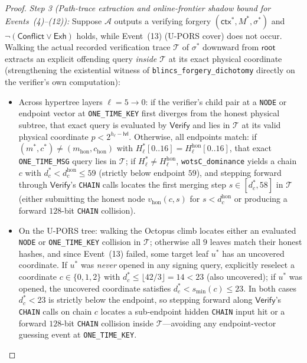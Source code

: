\documentclass[11pt,a4paper]{article}
\theoremstyle{definition}
\theoremstyle{remark}
\newcommand{\UPORS}{\textsf{U-PORS}}
\begin{document}
\begin{proof}
\emph{Step 3 (Path-trace extraction and online-frontier shadow bound for Events~(4)--(12)):}
Suppose $\mathcal{A}$ outputs a verifying forgery $(\mathsf{ctx}^*, M^*, \sigma^*)$ and $\neg (\mathsf{Conflict} \vee \mathsf{Exh})$ holds, while Event~(13) (\UPORS{} cover) does not occur. Walking the actual recorded verification trace $\mathcal{T}$ of $\sigma^*$ downward from $\mathsf{root}$ extracts an explicit offending query \emph{inside $\mathcal{T}$} at its exact physical coordinate (strengthening the existential witness of \texttt{blincs\_forgery\_dichotomy} directly on the verifier's own computation):
\begin{itemize}[leftmargin=1.4em,itemsep=1pt]
  \item Across hypertree layers $\ell = 5 \to 0$: if the verifier's child pair at a \texttt{NODE} or endpoint vector at \texttt{ONE\_TIME\_KEY} first diverges from the honest physical subtree, that exact query is evaluated by $\mathsf{Verify}$ and lies in $\mathcal{T}$ at its valid physical coordinate $p < 2^{h_\ell - \mathsf{lvl}}$. Otherwise, all endpoints match: if $(m^*, c^*) \neq (m_{\mathrm{hon}}, c_{\mathrm{hon}})$ with $H_\ell^*[0..16] = H_\ell^{\mathrm{hon}}[0..16]$, that exact \texttt{ONE\_TIME\_MSG} query lies in $\mathcal{T}$; if $H_\ell^* \neq H_\ell^{\mathrm{hon}}$, \texttt{wotsC\_dominance} yields a chain $c$ with $d_c^* < d_c^{\mathrm{hon}} \le 59$ (strictly below endpoint $59$), and stepping forward through $\mathsf{Verify}$'s \texttt{CHAIN} calls locates the first merging step $s \in [d_c^*, 58]$ in $\mathcal{T}$ (either submitting the honest node $v_{\mathrm{hon}}(c, s)$ for $s < d_c^{\mathrm{hon}}$ or producing a forward $128$-bit \texttt{CHAIN} collision).
  \item On the \UPORS{} tree: walking the Octopus climb locates either an evaluated \texttt{NODE} or \texttt{ONE\_TIME\_KEY} collision in $\mathcal{T}$; otherwise all $9$ leaves match their honest hashes, and since Event~(13) failed, some target leaf $u^*$ has an uncovered coordinate. If $u^*$ was \emph{never} opened in any signing query, explicitly reselect a coordinate $c \in \{0, 1, 2\}$ with $d_c^* \le \lfloor 42 / 3 \rfloor = 14 < 23$ (also uncovered); if $u^*$ was opened, the uncovered coordinate satisfies $d_c^* < s_{\min}(c) \le 23$. In both cases $d_c^* < 23$ is strictly below the endpoint, so stepping forward along $\mathsf{Verify}$'s \texttt{CHAIN} calls on chain $c$ locates a sub-endpoint hidden \texttt{CHAIN} input hit or a forward $128$-bit \texttt{CHAIN} collision inside $\mathcal{T}$---avoiding any endpoint-vector guessing event at \texttt{ONE\_TIME\_KEY}.

\end{itemize}
\end{proof}
\end{document}
